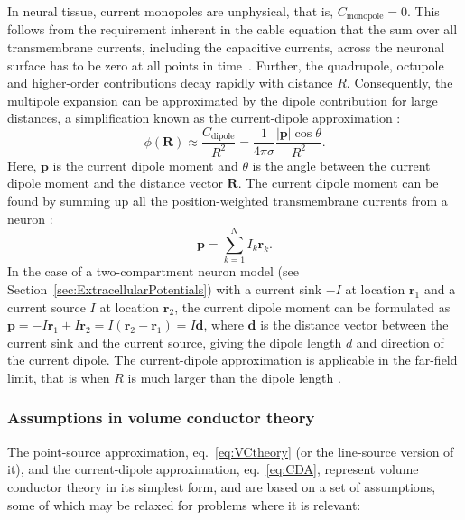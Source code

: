 \documentclass[preprint,11pt,authoryear]{elsarticle}
\newcommand{\gex}[1]{{\color{red}#1}}
\begin{document}
In neural tissue, current monopoles are unphysical, \gex{that is, $C_\text{monopole}=0$. This follows from the requirement inherent in the cable equation that the sum over all transmembrane currents, including the capacitive currents, across the neuronal surface has to be zero at all points in time~\citep{Pettersen2012}.} 
\gex{Further,} 
the quadrupole, octupole and higher-order contributions decay rapidly with distance $R$. Consequently, the multipole expansion can be approximated by the dipole contribution for large distances, a simplification known as the current-dipole approximation \citep{Nunez2006}:
\begin{equation}\label{eq:CDA}
\phi(\mathbf{R}) \approx \frac{C_\text{dipole}}{R^2} = \frac{1}{4 \pi \sigma} \frac{|\mathbf{p}| \cos \theta}{R^2}.
\end{equation}
Here, $\mathbf{p}$ is the current dipole moment and $\theta$ is the angle between the current dipole moment and the distance vector $\mathbf{R}$. The current dipole moment can be found by summing up all the position-weighted transmembrane currents from a neuron \citep{Pettersen2008, Pettersen2014, Nunez2006}: 
\begin{equation}\label{eq:dipole}
\mathbf{p} = \sum_{k=1}^N I_k \mathbf{r}_k.
\end{equation}
In the case of a two-compartment neuron model (see Section~\ref{sec:ExtracellularPotentials}) with a current sink $-I$ at location $\mathbf{r}_1$ and a current source $I$ at location $\mathbf{r}_2$, the current dipole moment can be formulated as $\mathbf{p} = -I\mathbf{r}_1 + I\mathbf{r}_2 = I(\mathbf{r}_2 - \mathbf{r}_1) = I\mathbf{d}$, where $\mathbf{d}$ is the distance vector between the current sink and the current source, giving the dipole length $d$ and direction of the current dipole. The current-dipole approximation is applicable in the far-field limit, that is when $R$ is much larger than the dipole length \citep{Nunez2006,Linden2010}.

\subsubsection{Assumptions in volume conductor theory}
\label{sec:VC_assumptions}
The point-source approximation, eq.~\ref{eq:VCtheory} (or the line-source version of it), and the current-dipole approximation, eq.~\eqref{eq:CDA}, represent volume conductor theory in its simplest form, and are based on a set of assumptions, some of which may be relaxed for problems where it is relevant: 
\end{document}
